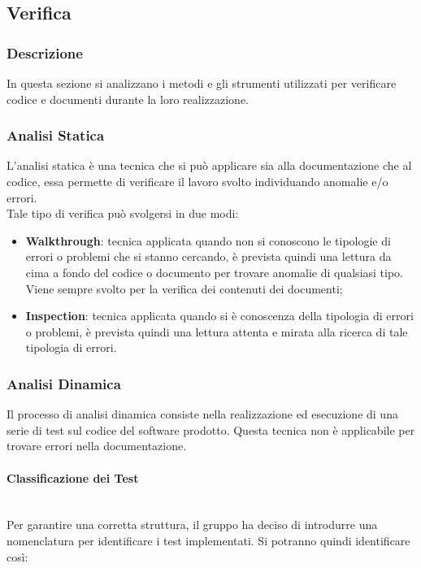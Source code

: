 \subsection{Verifica}\label{verifica}
\subsubsection{Descrizione}
In questa sezione si analizzano i metodi e gli strumenti utilizzati per verificare codice e documenti durante la loro realizzazione.

\subsubsection{Analisi Statica}
L'analisi statica è una tecnica che si può applicare sia alla documentazione che al codice, essa permette di verificare il lavoro svolto individuando anomalie e/o errori.\\
Tale tipo di verifica può svolgersi in due modi:
\begin{itemize}
	\item \textbf{Walkthrough}: tecnica applicata quando non si conoscono le tipologie di errori o problemi che si stanno cercando, è prevista quindi una lettura da cima a fondo del codice o documento per trovare anomalie di qualsiasi tipo.\\
	Viene sempre svolto per la verifica dei contenuti dei documenti;
	\item \textbf{Inspection}: tecnica applicata quando si è conoscenza della tipologia di errori o problemi, è prevista quindi una lettura attenta e mirata alla ricerca di tale tipologia di errori.
\end{itemize}

\subsubsection{Analisi Dinamica}
Il processo di analisi dinamica consiste nella realizzazione ed esecuzione di una serie di test sul codice del software prodotto. Questa tecnica non è applicabile per trovare errori nella documentazione.

\paragraph{Classificazione dei Test}\label{Class_test} \-\\
Per garantire una corretta struttura, il gruppo ha deciso di introdurre una nomenclatura per identificare i test implementati. Si potranno quindi identificare così:

